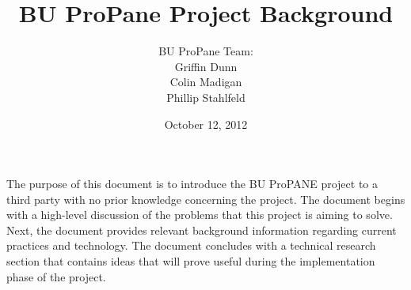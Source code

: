 \documentclass{article}
\begin{document}
	\begin{titlepage}

		\title{\textbf{BU ProPane Project Background}}
		\author{BU ProPane Team:\\Griffin Dunn\\Colin Madigan\\Phillip Stahlfeld}
		\date{October 12, 2012}
		\maketitle
		\noindent
		The purpose of this document is to introduce the BU ProPANE project to a third party with no prior knowledge concerning the project. The document begins with a high-level discussion of the problems that this project is aiming to solve. Next, the document provides relevant background information regarding current practices and technology. The document concludes with a technical research section that contains ideas that will prove useful during the implementation phase of the project. 
		
		\thispagestyle{empty}
	
		
	\end{titlepage}



	\thispagestyle{empty}
	\tableofcontents
	\newpage
\end{document}
